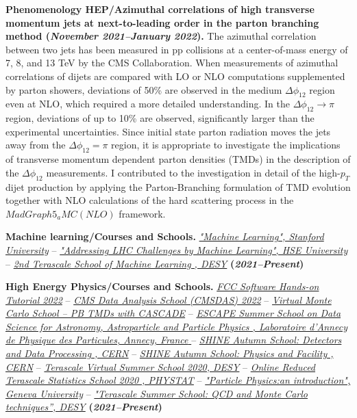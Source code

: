 \documentclass[11pt]{res}
\begin{document}
\begin{resume}
\textbf{Phenomenology HEP/Azimuthal correlations of high transverse momentum jets at next-to-leading order in the parton branching method {(\textit{November 2021--January 2022})}.}
The azimuthal correlation between two jets has been measured in pp collisions at a center-of-mass energy of 7, 8, and 13 TeV by the CMS Collaboration. When measurements of azimuthal correlations of dijets are compared with LO or NLO computations supplemented by parton showers, deviations of 50\% are observed in the medium $\Delta\phi_{12}$ region even at NLO, which required a more detailed understanding. In the $\Delta\phi_{12} \to \pi$ region, deviations of up to 10\% are observed, significantly larger than the experimental uncertainties. Since initial state parton radiation moves the jets away from the $\Delta\phi_{12} = \pi$ region, it is appropriate to investigate the implications of transverse momentum dependent parton densities (TMDs) in the description of the $\Delta\phi_{12}$ measurements. I contributed to the investigation in detail of the high-$p_{T}$ dijet production by applying the Parton-Branching formulation of TMD evolution together with NLO calculations of the hard scattering process in the $MadGraph5_aMC(NLO)$ framework.

\textbf{Machine learning/Courses and Schools.}
\href{https://www.coursera.org/account/accomplishments/verify/DRRN6452E8WB?utm_product=course}{\textit{"Machine Learning", Stanford University}} -- \href{https://www.coursera.org/account/accomplishments/certificate/MY4HQAEAYL9D}{\textit{"Addressing LHC Challenges by Machine Learning",  HSE University}} -- \href{https://drive.google.com/file/d/11AAS10GLKvA5oR2oZmcjLj1YBwBevQue/view?usp=sharing}{\textit{2nd Terascale School of Machine Learning , DESY}} \textbf{(\textit{2021--Present})}

\textbf{High Energy Physics/Courses and Schools.}
\href{https://indico.cern.ch/event/1182767/}{\textit{FCC Software Hands-on Tutorial 2022}} -- \href{https://lpc.fnal.gov/programs/schools-workshops/cmsdas.shtml}{\textit{CMS Data Analysis School (CMSDAS) 2022}} -- \href{https://drive.google.com/file/d/1Ui4phtxuFPd-trfQp6jCmL4qZOgEJvlf/view}{\textit{Virtual Monte Carlo School -- PB TMDs with CASCADE}} -- \href{https://drive.google.com/file/d/1D9BjE1nlL8UmRmZ3HQNqC6Cq1OxK0zB-/view?usp=sharing}{\textit{ESCAPE Summer School on Data Science for Astronomy, Astroparticle and Particle Physics , Laboratoire d’Annecy de Physique des Particules, Annecy, France }} -- \href{https://indico.cern.ch/event/964916/overview}{\textit{SHINE Autumn School: Detectors and Data Processing , CERN}} -- \href{https://indico.cern.ch/event/963826/}{\textit{SHINE Autumn School: Physics and Facility , CERN}} -- \href{https://indico.desy.de/event/26403/}{\textit{Terascale Virtual Summer School 2020, DESY}} -- \href{https://indico.desy.de/event/25594/}{\textit{Online Reduced Terascale Statistics School 2020 , PHYSTAT}} -- \href{https://www.coursera.org/account/accomplishments/certificate/CMVH65UHPLR3}{\textit{"Particle Physics:an introduction", Geneva University}} -- \href{https://drive.google.com/file/d/1fxuisoVa6oLr7eA6mWlE-xZxAs_ifsk6/view}{\textit{"Terascale Summer School: QCD and Monte Carlo techniques”, DESY}} \textbf{(\textit{2021--Present})}


\end{resume}
\end{document}
